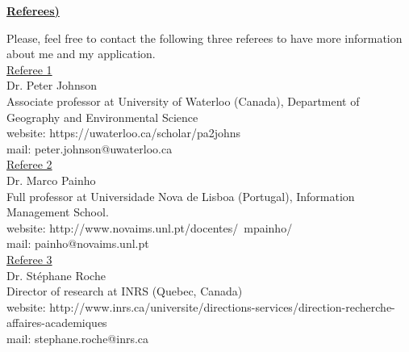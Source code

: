 \textbf{\underline{Referees)}}


Please, feel free to contact the following three referees to have more information about me and my application.\\

\underline{Referee 1}\\

Dr. Peter Johnson \\
Associate professor at University of Waterloo (Canada), Department of Geography and Environmental Science \\
website: https://uwaterloo.ca/scholar/pa2johns \\
mail: peter.johnson@uwaterloo.ca \\

\underline{Referee 2}\\

Dr. Marco Painho\\
Full professor at Universidade Nova de Lisboa (Portugal), Information Management School.\\
website:  http://www.novaims.unl.pt/docentes/~mpainho/\\
mail: painho@novaims.unl.pt \\

\underline{Referee 3}\\

Dr. Stéphane Roche\\
Director of research at INRS (Quebec, Canada)\\
website: http://www.inrs.ca/universite/directions-services/direction-recherche-affaires-academiques \\
mail: stephane.roche@inrs.ca \\